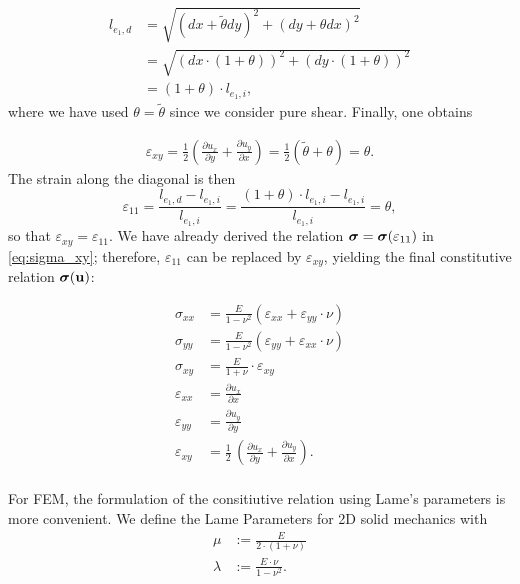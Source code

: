 \begin{align*}
l_{e_1,d}&=\sqrt{(dx+\tilde\theta dy)^2+(dy+\theta dx)^2} \\
&=\sqrt{(dx\cdot(1+\theta))^2+(dy\cdot (1+\theta))^2} \\
&=(1+\theta)\cdot l_{e_1,i},
\end{align*}
where we have used $\theta=\tilde\theta$ since we consider pure shear. Finally, one obtains

\begin{align*}
\varepsilon_{xy}=\frac{1}{2}\left(\frac{\partial u_x}{\partial y}+\frac{\partial u_y}{\partial x}\right)=\frac{1}{2}\left(\tilde\theta+\theta\right)=\theta.
\end{align*}
The strain along the diagonal is then
\begin{equation*}
\varepsilon_{11}=\frac{l_{e_1,d}-l_{e_1,i}}{l_{e_1,i}}=\frac{(1+\theta)\cdot l_{e_1,i}-l_{e_1,i}}{l_{e_1,i}}=\theta,
\end{equation*}
so that $\varepsilon_{xy}=\varepsilon_{11}$. We have already derived the relation $\boldsymbol{\sigma}=\boldsymbol{\sigma} (\varepsilon_{11})$ in \eqref{eq:sigma_xy}; therefore, $\varepsilon_{11}$ can be replaced by $\varepsilon_{xy}$, yielding the final constitutive relation $\boldsymbol{\sigma}(\mathbf{u})$:

\begin{align*}
\sigma_{xx}&=\frac{E}{1-\nu^2}(\varepsilon_{xx}+\varepsilon_{yy}\cdot \nu) \\
\sigma_{yy}&=\frac{E}{1-\nu^2}(\varepsilon_{yy}+\varepsilon_{xx}\cdot \nu) \\
\sigma_{xy}&=\frac{E}{1+\nu}\cdot \varepsilon_{xy}\\
\varepsilon_{xx}&=\frac{\partial u_x}{\partial x}\\
\varepsilon_{yy}&=\frac{\partial u_y}{\partial y}\\
\varepsilon_{xy}&=\frac{1}{2}\,\left(\frac{\partial u_x}{\partial y}+\frac{\partial u_y}{\partial x}\right).\\
\end{align*}


For FEM, the formulation of the consitiutive relation using Lame's parameters is more convenient. We define the Lame Parameters for 2D solid mechanics with
\begin{align*}
    \mu&:=\frac{E}{2\cdot(1+\nu)}\\
    \lambda&:=\frac{E\cdot \nu}{1-\nu^2}.
\end{align*}

